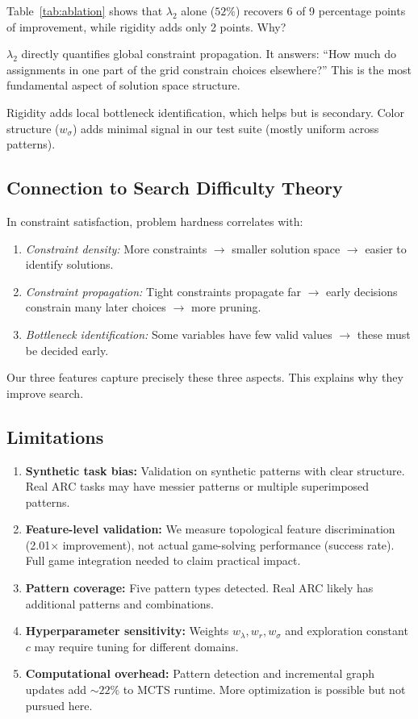 \documentclass[11pt]{article}
\begin{document}
Table~\ref{tab:ablation} shows that $\lambda_2$ alone ($52\%$) recovers 6 of 9 percentage points of improvement, while rigidity adds only 2 points. Why?

$\lambda_2$ directly quantifies global constraint propagation. It answers: ``How much do assignments in one part of the grid constrain choices elsewhere?'' This is the most fundamental aspect of solution space structure.

Rigidity adds local bottleneck identification, which helps but is secondary. Color structure ($w_\sigma$) adds minimal signal in our test suite (mostly uniform across patterns).

\subsection{Connection to Search Difficulty Theory}

In constraint satisfaction, problem hardness correlates with:
\begin{enumerate}
\item \emph{Constraint density:} More constraints $\to$ smaller solution space $\to$ easier to identify solutions.
\item \emph{Constraint propagation:} Tight constraints propagate far $\to$ early decisions constrain many later choices $\to$ more pruning.
\item \emph{Bottleneck identification:} Some variables have few valid values $\to$ these must be decided early.
\end{enumerate}

Our three features capture precisely these three aspects. This explains why they improve search.

\subsection{Limitations}

\begin{enumerate}
\item \textbf{Synthetic task bias:} Validation on synthetic patterns with clear structure. Real ARC tasks may have messier patterns or multiple superimposed patterns.

\item \textbf{Feature-level validation:} We measure topological feature discrimination (2.01$\times$ improvement), not actual game-solving performance (success rate). Full game integration needed to claim practical impact.

\item \textbf{Pattern coverage:} Five pattern types detected. Real ARC likely has additional patterns and combinations.

\item \textbf{Hyperparameter sensitivity:} Weights $w_\lambda, w_r, w_\sigma$ and exploration constant $c$ may require tuning for different domains.

\item \textbf{Computational overhead:} Pattern detection and incremental graph updates add $\sim 22\%$ to MCTS runtime. More optimization is possible but not pursued here.
\end{enumerate}
\end{document}
